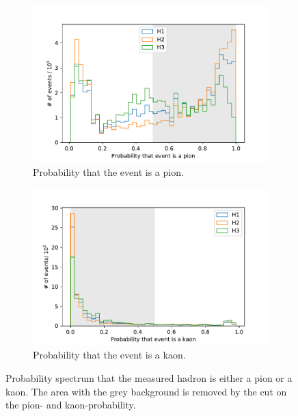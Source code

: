 \begin{figure}[H]
    \centering
    \begin{subfigure}{0.49\textwidth}
      \includegraphics[width=\textwidth]{plots/ProbPi.pdf}
      \caption{Probability that the event is a pion.}
      \label{fig:ProbPi}
    \end{subfigure}
    \begin{subfigure}{0.49\textwidth}
      \includegraphics[width=\textwidth]{plots/ProbK.pdf}
      \caption{Probability that the event is a kaon.}
      \label{fig:ProbK}
    \end{subfigure}
    \caption{Probability spectrum that the measured hadron is either a pion or a kaon.
    The area with the grey background is removed by the cut on the pion- and kaon-probability.}
    \label{f3}
\end{figure}

